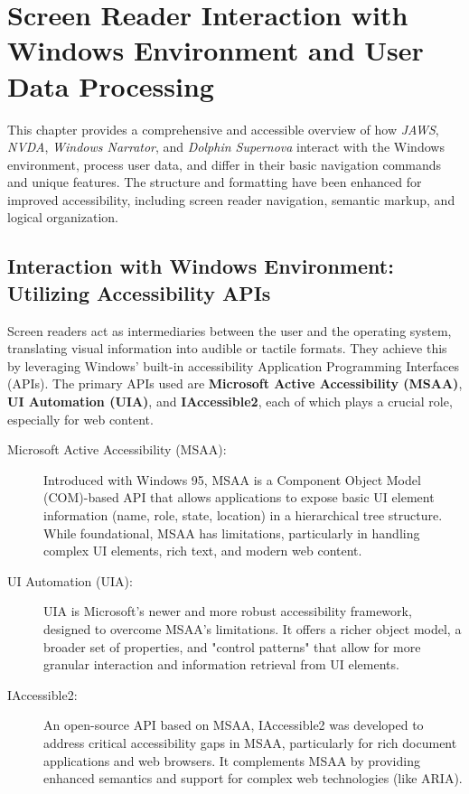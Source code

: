 \chapter{Screen Reader Interaction with Windows Environment and User Data Processing}
\label{chap:screenreader-windows}

\begin{raggedright}
This chapter provides a comprehensive and accessible overview of how \emph{JAWS}, \emph{NVDA}, \emph{Windows Narrator}, and \emph{Dolphin Supernova} interact with the Windows environment, process user data, and differ in their basic navigation commands and unique features. The structure and formatting have been enhanced for improved accessibility, including screen reader navigation, semantic markup, and logical organization.
\end{raggedright}

\section{Interaction with Windows Environment: Utilizing Accessibility APIs}
\label{sec:interaction-apis}

Screen readers act as intermediaries between the user and the operating system, translating visual information into audible or tactile formats. They achieve this by leveraging Windows' built-in accessibility Application Programming Interfaces (APIs). The primary APIs used are \textbf{Microsoft Active Accessibility (MSAA)}, \textbf{UI Automation (UIA)}, and \textbf{IAccessible2}, each of which plays a crucial role, especially for web content.


\begin{description}
    \item[Microsoft Active Accessibility (MSAA):] Introduced with Windows 95, MSAA is a Component Object Model (COM)-based API that allows applications to expose basic UI element information (name, role, state, location) in a hierarchical tree structure. While foundational, MSAA has limitations, particularly in handling complex UI elements, rich text, and modern web content. \cite{MSAAWiki}
    \item[UI Automation (UIA):] UIA is Microsoft's newer and more robust accessibility framework, designed to overcome MSAA's limitations. It offers a richer object model, a broader set of properties, and "control patterns" that allow for more granular interaction and information retrieval from UI elements. \cite{UIAutomationOverview}
    \item[IAccessible2:] An open-source API based on MSAA, IAccessible2 was developed to address critical accessibility gaps in MSAA, particularly for rich document applications and web browsers. It complements MSAA by providing enhanced semantics and support for complex web technologies (like ARIA). \cite{JantridIAccessible2}
\end{description}

